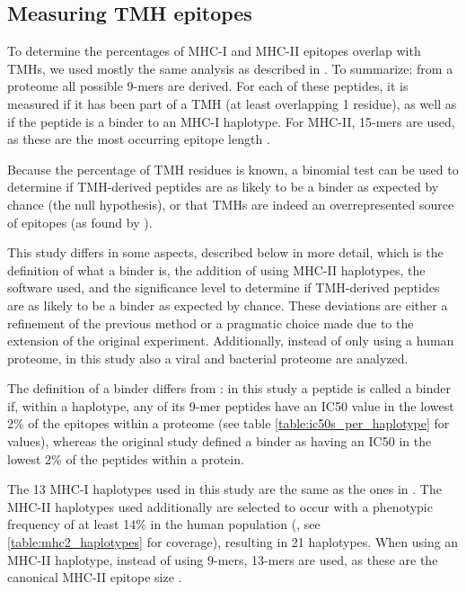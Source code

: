 \subsection{Measuring TMH epitopes}

To determine the percentages of MHC-I and MHC-II epitopes overlap
with TMHs, we used mostly the same analysis as described in \cite{bianchi2017}.
To summarize: from a proteome all possible 9-mers are derived. For each
of these peptides, it is measured if it has been part of a 
TMH (at least overlapping 1 residue), 
as well as if the peptide is a binder to an MHC-I haplotype.
For MHC-II, 15-mers are used, as these are the most occurring
epitope length \cite{bergseng2015different}.

Because the percentage of TMH residues is known, a binomial test can be
used to determine if TMH-derived peptides are as likely to be a binder
as expected by chance (the null hypothesis), or that TMHs are indeed an
overrepresented source of epitopes (as found by \cite{bianchi2017}).

This study differs in some aspects, described below in more detail,
which is the definition of what a binder is,
the addition of using MHC-II haplotypes, the software used,
and the significance level to determine if TMH-derived peptides are as 
likely to be a binder as expected by chance.
These deviations are either a refinement of the previous method or
a pragmatic choice made due to the extension of the original experiment.
Additionally, instead of only using a human proteome, in this study
also a viral and bacterial proteome are analyzed.

The definition of a binder differs from \cite{bianchi2017}:
in this study a peptide is called a binder if, within a haplotype, 
any of its 9-mer peptides have an IC50 value in the lowest 2\% of 
the epitopes within a proteome (see table \ref{table:ic50s_per_haplotype} for values), 
whereas the original study defined
a binder as having an IC50 in the lowest 2\% of the peptides within a protein.

The 13 MHC-I haplotypes used in this study are the same as 
the ones in \cite{bianchi2017}.
The MHC-II haplotypes used additionally are selected 
to occur with a phenotypic frequency of at least 
14\% in
the human population (\cite{greenbaum2011functional},
see \ref{table:mhc2_haplotypes} for coverage),
resulting in 21 haplotypes.
When using an MHC-II haplotype, instead of using 9-mers, 13-mers are
used, as these are the canonical MHC-II epitope size .

